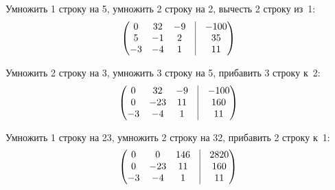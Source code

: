 \documentclass[10pt, a4paper, titlepage]{article}
\begin{document}
Умножить 1 строку на 5, умножить 2 строку на 2, вычесть 2 строку из~1:
\begin{equation*}
    \begin{pmatrix}
        0 & 32 & -9 & \vrule & -100 \\
        5 & -1 & 2 & \vrule & 35 \\
        -3 & -4 & 1 & \vrule & 11
    \end{pmatrix}
\end{equation*}

Умножить 2 строку на 3, умножить 3 строку на 5, прибавить 3 строку к~2:
\begin{equation*}
    \begin{pmatrix}
        0 & 32 & -9 & \vrule & -100 \\
        0 & -23 & 11 & \vrule & 160 \\
        -3 & -4 & 1 & \vrule & 11
    \end{pmatrix}
\end{equation*}

Умножить 1 строку на 23, умножить 2 строку на 32, прибавить 2 строку к~1:
\begin{equation*}
    \begin{pmatrix}
        0 & 0 & 146 & \vrule & 2820 \\
        0 & -23 & 11 & \vrule & 160 \\
        -3 & -4 & 1 & \vrule & 11
    \end{pmatrix}
\end{equation*}

\end{document}
